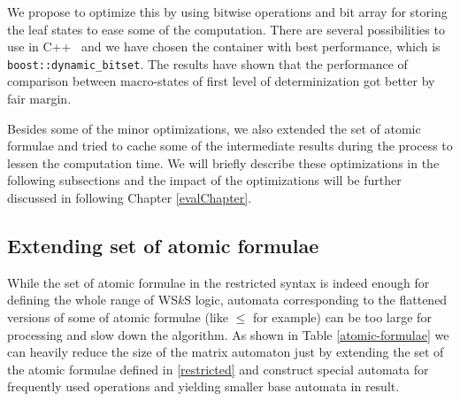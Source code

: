  We propose to optimize this by using bitwise operations and bit array for
 storing the leaf states to ease some of the computation. There are several
 possibilities to use in C++~\cite{bitwise} and we have chosen the container
 with best performance, which is \texttt{boost::dynamic\_bitset}. The results
 have shown that the performance of comparison between macro-states of first
 level of determinization got better by fair margin. 
 
 Besides some of the minor optimizations, we also extended the set of atomic
 formulae and tried to cache some of the intermediate results during the
 process to lessen the computation time. We will briefly describe these
 optimizations in the following subsections and the impact of the optimizations
 will be further discussed in following Chapter \ref{evalChapter}.
 
 \subsection{Extending set of atomic formulae}
 
 While the set of atomic formulae in the restricted syntax is indeed enough for
 defining the whole range of WS$k$S logic, automata corresponding to the
 flattened versions of some of atomic formulae (like $\leq$ for example) can
 be too large for processing and slow down the algorithm. As shown in Table
 \ref{atomic-formulae} we can heavily reduce the size of the matrix automaton
 just by extending the set of the atomic formulae defined in \ref{restricted} and
 construct special automata for frequently used operations and yielding
 smaller base automata in result. 
 
